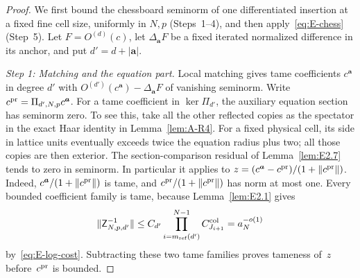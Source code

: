 \begin{proof}
We first bound the chessboard seminorm of one differentiated insertion at a fixed fine cell size, uniformly in $N,p$ (Steps~1--4), and then apply~\eqref{eq:E-chess} (Step~5). Let $F=O^{(d)}(c)$, let $\Delta_{\boldsymbol a}F$ be a fixed iterated normalized difference in its anchor, and put $d'=d+|\boldsymbol a|$.

\emph{Step 1: Matching and the equation part.} Local matching gives tame coefficients $c^{\boldsymbol a}$ in degree $d'$ with $O^{(d')}(c^{\boldsymbol a})-\Delta_{\boldsymbol a}F$ of vanishing seminorm. Write $c^{\rm pr}=\Pi_{d',N,p}c^{\boldsymbol a}$. For a tame coefficient in $\ker\Pi_{d'}$, the auxiliary equation section has seminorm zero. To see this, take all the other reflected copies as the spectator in the exact Haar identity in Lemma~\ref{lem:A-R4}. For a fixed physical cell, its side in lattice units eventually exceeds twice the equation radius plus two; all those copies are then exterior. The section-comparison residual of Lemma~\ref{lem:E2.7} tends to zero in seminorm. In particular it applies to $z=(c^{\boldsymbol a}-c^{\rm pr})/(1+\|c^{\rm pr}\|)$. Indeed, $c^{\boldsymbol a}/(1+\|c^{\rm pr}\|)$ is tame, and $c^{\rm pr}/(1+\|c^{\rm pr}\|)$ has norm at most one. Every bounded coefficient family is tame, because Lemma~\ref{lem:E2.1} gives
\begin{equation*}
 \|\mathsf Z_{N,p,d'}^{-1}\|\le C_{d'}\prod_{i=m_{\mathrm{ref}}(d')}^{N-1}C^{\rm col}_{J_{i+1}}=a_N^{-o(1)}
\end{equation*}
by~\eqref{eq:E-log-cost}. Subtracting these two tame families proves tameness of~$z$ before~$c^{\rm pr}$ is bounded.


\end{proof}
